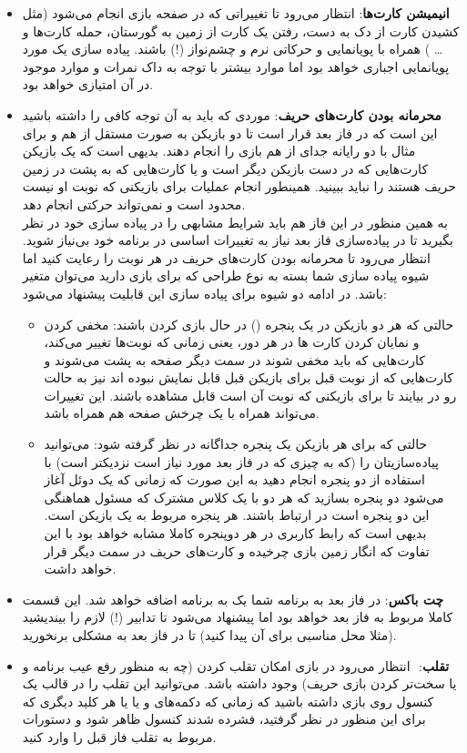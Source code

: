 \documentclass[]{article}
\begin{document}
\begin{itemize}
    
    \item \textbf{انیمیشن کارت‌ها}: انتظار می‌رود تا تغییراتی که در صفحه بازی انجام می‌شود (مثل کشیدن کارت از دک به دست، رفتن یک کارت از زمین به گورستان، حمله کارت‌ها و … ) همراه با پویانمایی و حرکاتی نرم و چشم‌نواز (!) باشند. پیاده سازی یک مورد پویانمایی اجباری خواهد بود اما موارد بیشتر با توجه به داک نمرات و موارد موجود در آن امتیازی خواهد بود.
    
    
    \item \textbf{محرمانه بودن کارت‌های حریف}:
     موردی که باید به آن توجه کافی را داشته باشید این است که در فاز بعد قرار است تا دو بازیکن به صورت مستقل از هم و برای مثال با دو رایانه جدای از هم بازی را انجام دهند. بدیهی است که یک بازیکن کارت‌هایی که در دست بازیکن دیگر است و یا کارت‌هایی که به پشت در زمین حریف‌ هستند را نباید ببینید. همینطور انجام عملیات برای بازیکنی که نوبت او نیست محدود است و نمی‌تواند حرکتی انجام دهد. \\
    به همین منظور در این فاز هم باید شرایط مشابهی را در پیاده سازی خود در نظر بگیرید تا در پیاده‌سازی فاز بعد نیاز به تغییرات اساسی در برنامه خود بی‌نیاز شوید. انتظار می‌رود تا محرمانه بودن کارت‌های حریف در هر نوبت را رعایت کنید اما شیوه  پیاده سازی شما بسته به نوع طراحی که برای بازی دارید می‌توان متغیر باشد. در ادامه دو شیوه برای پیاده سازی این قابلیت پیشنهاد می‌شود:
    \begin{itemize}
        \item حالتی که هر دو بازیکن در یک پنجره () در حال بازی کردن باشند:‌ مخفی کردن و نمایان کردن کارت ها در هر دور، یعنی زمانی که نوبت‌ها تغییر می‌کند، کارت‌هایی که باید مخفی شوند در سمت دیگر صفحه به پشت می‌شوند و کارت‌هایی که از نوبت قبل برای بازیکن قبل قابل نمایش نبوده اند نیز به حالت رو در بیایند تا برای بازیکنی که نوبت آن است قابل مشاهده باشند. این تغییرات می‌تواند همراه با یک چرخش صفحه هم همراه باشد.
        \item حالتی که برای هر بازیکن یک پنجره جداگانه در نظر گرفته شود: می‌توانید پیاده‌سازیتان را (که به چیزی که در فاز بعد مورد نیاز است نزدیکتر است) با استفاده از دو پنجره انجام دهید به این صورت که زمانی که یک دوئل آغاز می‌شود دو پنجره بسازید که هر دو با یک کلاس مشترک که مسئول هماهنگی این دو پنجره است در ارتباط باشند. هر پنجره مربوط به یک بازیکن است. بدیهی است که رابط کاربری در هر دوپنجره کاملا مشابه خواهد بود با این تفاوت که انگار زمین بازی چرخیده و کارت‌های حریف در سمت دیگر قرار خواهد داشت. 
    \end{itemize}
    \item \textbf{چت باکس}: در فاز بعد به برنامه شما یک  به برنامه اضافه خواهد شد. این قسمت کاملا مربوط به فاز بعد خواهد بود اما پیشنهاد می‌شود تا تدابیر (!) لازم را بیندیشید (مثلا محل مناسبی برای آن پیدا کنید) تا در فاز بعد به مشکلی برنخورید.
    \item \textbf{تقلب}:
    ‌ انتظار می‌رود در بازی امکان تقلب کردن (چه به منظور رفع عیب برنامه و یا سخت‌تر کردن بازی حریف) وجود داشته باشد. می‌توانید این تقلب را در قالب یک کنسول  روی بازی داشته باشید که زمانی که دکمه‌های  و یا  یا هر کلید دیگری که برای این منظور در نظر گرفتید، فشرده شدند کنسول ظاهر شود و دستورات مربوط به تقلب فاز قبل را وارد کنید.
    

\end{itemize}
\end{document}
